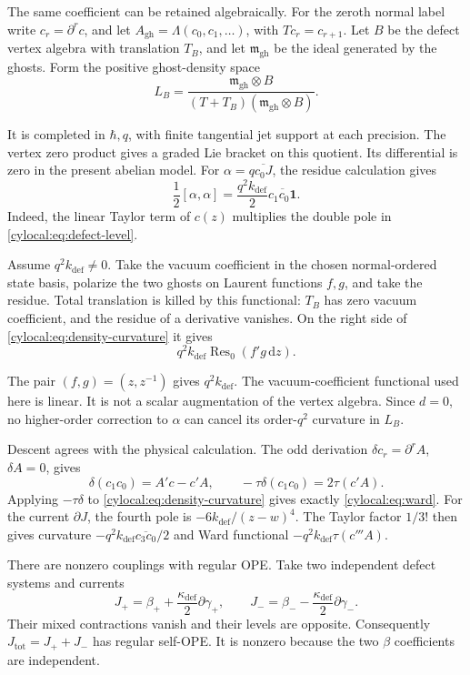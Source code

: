 The same coefficient can be retained algebraically. For the zeroth
normal label write $c_r=\partial^rc$, and let
$A_{\mathrm{gh}}=\Lambda(c_0,c_1,\ldots)$, with $T c_r=c_{r+1}$.
Let $B$ be the defect vertex algebra with translation $T_B$, and let
$\mathfrak m_{\mathrm{gh}}$ be the ideal generated by the ghosts.
Form the positive ghost-density
space
\[
 L_B=\frac{\mathfrak m_{\mathrm{gh}}\otimes B}
             {(T+T_B)(\mathfrak m_{\mathrm{gh}}\otimes B)}.
\]

It is completed in $\hbar,q$, with finite tangential jet support at
each precision. The vertex zero product gives a graded Lie bracket on this
quotient. Its differential is zero in the present abelian model.
For $\alpha=q\overline{c_0J}$, the residue calculation gives
\begin{equation}\label{cylocal:eq:density-curvature}
 \frac12[\alpha,\alpha]
   =\frac{q^2k_{\mathrm{def}}}{2}
         \overline{c_1c_0\mathbf1}.
\end{equation}
Indeed, the linear Taylor term of $c(z)$ multiplies the double pole
in \eqref{cylocal:eq:defect-level}.

Assume $q^2k_{\mathrm{def}}\ne0$. Take the vacuum coefficient in the chosen
normal-ordered state basis, polarize the two ghosts on Laurent
functions $f,g$, and take the residue. Total translation is killed
by this functional: $T_B$ has zero vacuum coefficient, and the
residue of a derivative vanishes. On the right side of
\eqref{cylocal:eq:density-curvature} it gives
\[
 q^2k_{\mathrm{def}}\operatorname{Res}_0(f'g\,\mathrm dz).
\]

The pair $(f,g)=(z,z^{-1})$ gives $q^2k_{\mathrm{def}}$.
The vacuum-coefficient functional used here is linear. It is not
a scalar augmentation of the vertex algebra. Since $d=0$, no
higher-order correction to $\alpha$ can cancel its order-$q^2$
curvature in $L_B$.

Descent agrees with the physical calculation. The odd derivation
$\delta c_r=\partial^r A$, $\delta A=0$, gives
\[
 \delta(c_1c_0)=A'c-c'A,
 \qquad -\tau\delta(c_1c_0)=2\tau(c'A).
\]
Applying $-\tau\delta$ to
\eqref{cylocal:eq:density-curvature} gives exactly
\eqref{cylocal:eq:ward}. For the current $\partial J$, the fourth
pole is $-6k_{\mathrm{def}}/(z-w)^4$. The Taylor factor $1/3!$
then gives curvature
$-q^2k_{\mathrm{def}}\overline{c_3c_0}/2$ and Ward functional
$-q^2k_{\mathrm{def}}\tau(c'''A)$.

There are nonzero couplings with regular OPE. Take two independent
defect systems and currents
\[
 J_+=\beta_++\frac{\kappa_{\mathrm{def}}}{2}\partial\gamma_+,
 \qquad
 J_-=\beta_- -\frac{\kappa_{\mathrm{def}}}{2}\partial\gamma_-.
\]
Their mixed contractions vanish and their levels are opposite.
Consequently $J_{\mathrm{tot}}=J_++J_-$ has regular self-OPE.
It is nonzero because the two $\beta$ coefficients are independent.

